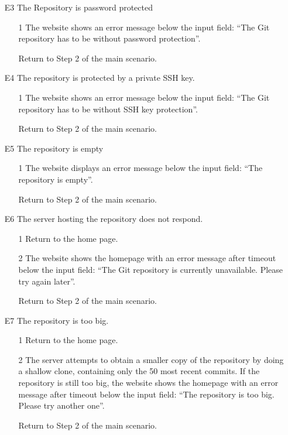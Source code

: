 \documentclass[11pt]{scrartcl}
\begin{document}
\begin{description}[leftmargin=!,labelwidth=\widthof{\bfseries Frequency of use:}]
\begin{enumerate}[leftmargin=1.5em]
			\item[E3] The Repository is password protected
				\begin{enumerate}
					\item[1] The website shows an
						error message below the input field: \enquote{The Git repository has to be without 
						password protection}.
					\item[] Return to Step 2 of the main scenario.
				\end{enumerate}
				
			\item[E4] The repository is protected by a private SSH key.
				\begin{enumerate}
					\item[1] The website shows an error message below the input field: \enquote{The Git repository 
							has to be without SSH key protection}.
					\item[] Return to Step 2 of the main scenario.
				\end{enumerate}
				
			\item[E5] The repository is empty
				\begin{enumerate}
					\item[1]  The website displays an error message below the input field: \enquote{The repository is empty}.
					\item[] Return to Step 2 of the main scenario.
				\end{enumerate}	
										
			\item[E6] The server hosting the repository does not respond.
				\begin{enumerate}
					\item[1] Return to the home page.
					\item[2] The website shows the homepage with an error message after timeout below the input 	
						field: 	\enquote{The Git repository is currently unavailable. Please try again later}.
					\item[] Return to Step 2 of the main scenario.
					
				\end{enumerate}
				
			\item[E7] The repository is too big.
				\begin{enumerate}
					\item[1] Return to the home page.
					\item[2] The server attempts to obtain a 
						smaller copy of the repository by doing a shallow clone, containing only
						the 50 most recent commits. If the repository is still too big, the
						website shows the homepage with an error message after timeout below the input 	
						field: \enquote{The repository is too big. Please try another one}.
					\item[] Return to Step 2 of the main scenario.
				\end{enumerate}
		\end{enumerate}


\end{description}
\end{document}
